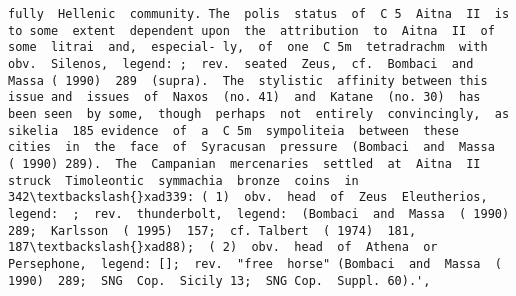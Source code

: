 \documentclass[11pt]{article}
\begin{document}
\begin{Verbatim}[commandchars=\\\{\}]
fully  Hellenic  community. The  polis  status  of  C 5  Aitna  II  is  to some  extent  dependent upon  the  attribution  to  Aitna  II  of  some  litrai  and,  especial- ly,  of  one  C 5m  tetradrachm  with  obv.  Silenos,  legend: ;  rev.  seated  Zeus,  cf.  Bombaci  and  Massa ( 1990)  289  (supra).  The  stylistic  affinity between this issue and  issues  of  Naxos  (no. 41)  and  Katane  (no. 30)  has  been seen  by some,  though  perhaps  not  entirely  convincingly,  as sikelia  185 evidence  of  a  C 5m  sympoliteia  between  these  cities  in  the  face  of  Syracusan  pressure  (Bombaci  and  Massa  ( 1990) 289).  The  Campanian  mercenaries  settled  at  Aitna  II  struck  Timoleontic  symmachia  bronze  coins  in  342\textbackslash{}xad339: ( 1)  obv.  head  of  Zeus  Eleutherios,  legend:  ;  rev.  thunderbolt,  legend:  (Bombaci  and  Massa  ( 1990)  289;  Karlsson  ( 1995)  157;  cf. Talbert  ( 1974)  181,  187\textbackslash{}xad88);  ( 2)  obv.  head  of  Athena  or Persephone,  legend: [];  rev.  "free  horse" (Bombaci  and  Massa  ( 1990)  289;  SNG  Cop.  Sicily 13;  SNG Cop.  Suppl. 60).',

\end{Verbatim}
\end{document}
